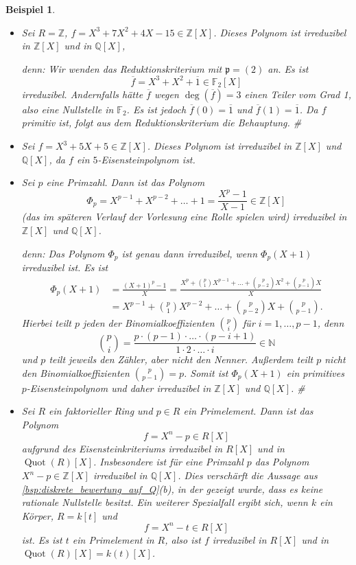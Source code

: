 \documentclass[a4paper, twoside, 11pt, ngerman]{report}
\newcommand{\NN}{\mathds N}
\newcommand{\QQ}{\mathds Q}
\newcommand{\ZZ}{\mathds Z}
\DeclareMathOperator{\Quot}{Quot}
\theoremstyle{definistyle}
\newtheorem{bsp}[satz]{Beispiel}
\theoremstyle{remark}
\newenvironment{denn}%
  {\par\textit{denn:}}%
  {\hfill\#\par}
\begin{document}
\begin{bsp}\label{bsp:irreduzibilitaet_polynome}
\begin{itemize}
    \item[(a)] Sei $R = \ZZ$, $f = X^3 + 7X^2 + 4X - 15 \in \ZZ[X]$. Dieses Polynom ist irreduzibel in $\ZZ[X]$ und in $\QQ[X]$,
    \begin{denn}
    Wir wenden das Reduktionskriterium mit $\mathfrak{p} = (2)$ an. Es ist \[\overline{f} = X^3 + X^2 + \overline{1} \in \mathbb{F}_2[X]\] irreduzibel. Andernfalls hätte $\overline{f}$ wegen $\deg(\overline{f}) = 3$ einen Teiler vom Grad 1, also eine Nullstelle in $\mathbb{F}_2$. Es ist jedoch $\overline{f}(0) = \overline{1}$ und $\overline{f}(1) = \overline{1}$. Da $f$ primitiv ist, folgt aus dem Reduktionskriterium die Behauptung. 
    \end{denn}
    \item[(b)] Sei $f = X^3 + 5X + 5 \in \ZZ[X]$. Dieses Polynom ist irreduzibel in $\ZZ[X]$ und $\QQ[X]$, da $f$ ein $5$-Eisensteinpolynom ist.

    \item[(c)] Sei $p$ eine Primzahl. Dann ist das Polynom
    \[
    \Phi_p = X^{p-1} + X^{p-2} + \dots + 1 = \frac{X^p - 1}{X - 1} \in \ZZ[X]
    \]
    (das im späteren Verlauf der Vorlesung eine Rolle spielen wird) irreduzibel in $\ZZ[X]$ und $\QQ[X]$.
    \begin{denn} Das Polynom $\Phi_p$ ist genau dann irreduzibel, wenn $\Phi_p(X+1)$ irreduzibel ist.
Es ist
\begin{align*}
\Phi_p(X+1) &= \frac{(X+1)^p - 1}{X} = \frac{X^p + \binom{p}{1} X^{p-1} + \dots + \binom{p}{p-2} X^2 + \binom{p}{p-1} X}{X}\\
&= X^{p-1} + \binom{p}{1} X^{p-2} + \dots + \binom{p}{p-2} X + \binom{p}{p-1}.
\end{align*}
Hierbei teilt $p$ jeden der Binomialkoeffizienten $\binom{p}{i}$ für $i = 1, \dots, p-1$, denn \[\binom{p}{i} = \frac{p \cdot (p-1) \cdot \dots \cdot (p-i+1)}{1 \cdot 2 \cdot \dots \cdot i} \in \NN\] und $p$ teilt jeweils den Zähler, aber nicht den Nenner.
Außerdem teilt $p$ nicht den Binomialkoeffizienten $\binom{p}{p-1}=p$.
Somit ist $\Phi_p(X+1)$ ein primitives $p$-Eisensteinpolynom und daher irreduzibel in $\ZZ[X]$ und $\QQ[X]$.
    \end{denn}
    \item[(d)] Sei $R$ ein faktorieller Ring und $p\in R$ ein Primelement.
    Dann ist das Polynom \[f=X^n-p\in R[X]\] aufgrund des Eisensteinkriteriums irreduzibel in $R[X]$ und in $\Quot(R)[X]$. Insbesondere ist für eine Primzahl $p$ das Polynom $X^n-p\in\ZZ[X]$ irreduzibel in $\QQ[X]$. Dies verschärft die Aussage aus \ref{bsp:diskrete_bewertung_auf_Q}(b), in der gezeigt wurde, dass es keine rationale Nullstelle besitzt. Ein weiterer Spezialfall ergibt sich, wenn $k$  
    ein Körper, $R = k[t]$ und \[f = X^n - t \in R[X]\]
    ist. Es ist $t$ ein Primelement in $R$, also ist $f$ irreduzibel in $R[X]$ und in $\Quot(R)[X] = k(t)[X]$.
\end{itemize}
\end{bsp}
\end{document}
